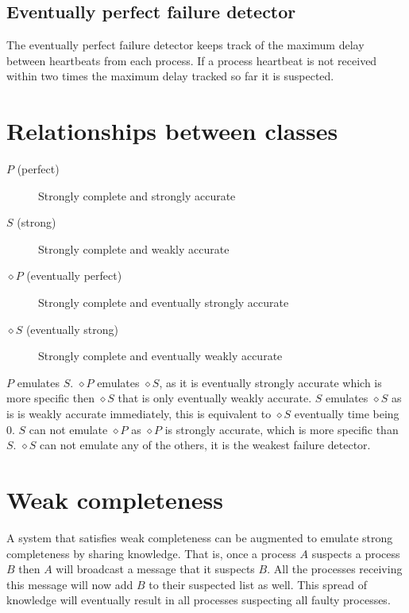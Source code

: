 \documentclass[11pt]{amsart}
\begin{document}
\subsection{Eventually perfect failure detector}

The eventually perfect failure detector keeps track of the maximum delay
between heartbeats from each process. If a process heartbeat is not received
within two times the maximum delay tracked so far it is suspected.

\section{Relationships between classes}

\begin{description}
	\item[$P$ (perfect)] Strongly complete and strongly accurate
	\item[$S$ (strong)] Strongly complete and weakly accurate
	\item[$\diamond P$ (eventually perfect)] Strongly complete and eventually strongly accurate
	\item[$\diamond S$ (eventually strong)] Strongly complete and eventually weakly accurate
\end{description}

$P$ emulates $S$. 
$\diamond P$ emulates $\diamond S$, as it is eventually strongly accurate which
is more specific then $\diamond S$ that is only eventually weakly accurate.
$S$ emulates $\diamond S$ as is is weakly accurate immediately, this is equivalent to $\diamond S$ eventually time being 0.
$S$ can not emulate $\diamond P$ as $\diamond P$ is strongly accurate, which is more specific than $S$.
$\diamond S$ can not emulate any of the others, it is the weakest failure detector.

\section{Weak completeness}

A system that satisfies weak completeness can be augmented to emulate strong
completeness by sharing knowledge. That is, once a process $A$ suspects a
process $B$ then $A$ will broadcast a message that it suspects $B$. All the
processes receiving this message will now add $B$ to their suspected list as
well. This spread of knowledge will eventually result in all processes
suspecting all faulty processes.
\end{document}
